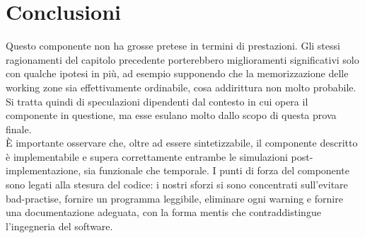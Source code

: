 \documentclass[12pt,a4paper,titlepage]{article}
\begin{document}
		\section{Conclusioni}
			Questo componente non ha grosse pretese in termini di prestazioni. Gli stessi ragionamenti del capitolo precedente porterebbero miglioramenti significativi solo con qualche ipotesi in più, ad esempio supponendo che la memorizzazione delle working zone sia effettivamente ordinabile, cosa addirittura non molto probabile. Si tratta quindi di speculazioni dipendenti dal contesto in cui opera il componente in questione, ma esse esulano molto dallo scopo di questa prova finale.\\
			È importante osservare che, oltre ad essere sintetizzabile, il componente descritto è implementabile e supera correttamente entrambe le simulazioni post-implementazione, sia funzionale che temporale. I punti di forza del componente sono legati alla stesura del codice: i nostri sforzi si sono concentrati sull'evitare bad-practise, fornire un programma leggibile, eliminare ogni warning e fornire una documentazione adeguata, con la forma mentis che contraddistingue l'ingegneria del software.
\end{document}
